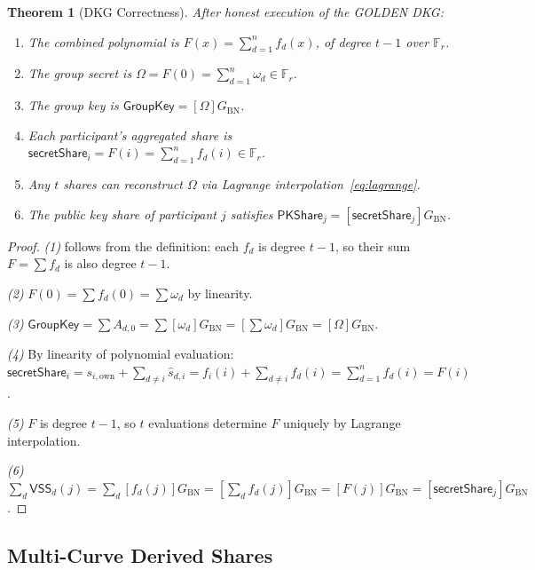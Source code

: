 \documentclass[11pt,a4paper]{article}
\newtheorem{theorem}{Theorem}[section]
\newcommand{\F}{\mathbb{F}}
\newcommand{\Fr}{\F_r}
\newcommand{\genbn}{G_{\mathrm{BN}}}
\newcommand{\VSS}{\mathsf{VSS}}
\begin{document}
\begin{theorem}[DKG Correctness]
  \label{thm:dkg-correct}
  After honest execution of the GOLDEN DKG:
  \begin{enumerate}[nosep]
    \item The combined polynomial is
      $F(x) = \sum_{d=1}^{n} f_d(x)$, of degree $t-1$ over $\Fr$.
    \item The group secret is
      $\Omega = F(0) = \sum_{d=1}^{n} \omega_d \in \Fr$.
    \item The group key is
      $\mathsf{GroupKey} = [\Omega]\genbn$.
    \item Each participant's aggregated share is
      $\mathsf{secretShare}_i = F(i) = \sum_{d=1}^{n} f_d(i) \in \Fr$.
    \item Any $t$ shares can reconstruct $\Omega$ via Lagrange
      interpolation~\eqref{eq:lagrange}.
    \item The public key share of participant $j$ satisfies
      $\mathsf{PKShare}_j = [\mathsf{secretShare}_j]\genbn$.
  \end{enumerate}
\end{theorem}

\begin{proof}
  \textit{(1)} follows from the definition: each $f_d$ is degree $t-1$, so
  their sum $F = \sum f_d$ is also degree $t-1$.

  \textit{(2)} $F(0) = \sum f_d(0) = \sum \omega_d$ by linearity.

  \textit{(3)} $\mathsf{GroupKey} = \sum A_{d,0} = \sum [\omega_d]\genbn
  = [\sum \omega_d]\genbn = [\Omega]\genbn$.

  \textit{(4)} By linearity of polynomial evaluation:
  $\mathsf{secretShare}_i = s_{i,\mathrm{own}} + \sum_{d \ne i} \hat{s}_{d,i}
  = f_i(i) + \sum_{d \ne i} f_d(i) = \sum_{d=1}^n f_d(i) = F(i)$.

  \textit{(5)} $F$ is degree $t-1$, so $t$ evaluations determine $F$
  uniquely by Lagrange interpolation.

  \textit{(6)} $\sum_d \VSS_d(j) = \sum_d [f_d(j)]\genbn
  = [\sum_d f_d(j)]\genbn = [F(j)]\genbn = [\mathsf{secretShare}_j]\genbn$.
\end{proof}

\subsection{Multi-Curve Derived Shares}
\label{sec:derived}
\end{document}
